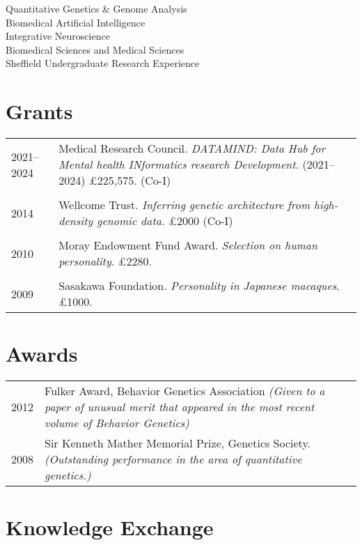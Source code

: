 \documentclass[11pt]{article}
\begin{document}
Quantitative Genetics \& Genome Analysis \\
Biomedical Artificial Intelligence \\
Integrative Neuroscience \\
Biomedical Sciences and Medical Sciences \\
Sheffield Undergraduate Research Experience 

\section*{Grants}

\begin{tabular}{p{3cm}p{12cm}}

2021--2024 & Medical Research Council. \emph{DATAMIND: Data Hub for Mental health INformatics research Development}. (2021--2024) £225,575. (Co-I) \\ \\

2014 & Wellcome Trust. \emph{Inferring genetic architecture from high-density genomic data.} £2000 (Co-I) \\ \\

2010 & Moray Endowment Fund Award. \emph{Selection on human personality}. £2280. \\ \\

2009 & Sasakawa Foundation. \emph{Personality in Japanese macaques}. £1000.

\end{tabular}

\section*{Awards}

\begin{tabular}{p{3cm}p{12cm}}

2012 & Fulker Award, Behavior Genetics Association \emph{(Given to a paper of unusual merit that appeared in the most recent volume of Behavior Genetics)} \\
2008 & Sir Kenneth Mather Memorial Prize, Genetics Society. \emph{(Outstanding performance in the area of quantitative genetics.)}

\end{tabular}


\section*{Knowledge Exchange}
\end{document}

